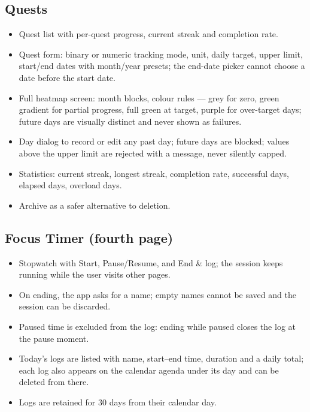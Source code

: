 \documentclass[12pt,a4paper]{article}
\begin{document}
\subsection{Quests}
\begin{itemize}
  \item Quest list with per-quest progress, current streak and completion rate.
  \item Quest form: binary or numeric tracking mode, unit, daily target,
        upper limit, start/end dates with month/year presets; the end-date
        picker cannot choose a date before the start date.
  \item Full heatmap screen: month blocks, colour rules --- grey for zero,
        green gradient for partial progress, full green at target, purple
        for over-target days; future days are visually distinct and never
        shown as failures.
  \item Day dialog to record or edit any past day; future days are blocked;
        values above the upper limit are rejected with a message, never
        silently capped.
  \item Statistics: current streak, longest streak, completion rate,
        successful days, elapsed days, overload days.
  \item Archive as a safer alternative to deletion.
\end{itemize}

\subsection{Focus Timer (fourth page)}
\begin{itemize}
  \item Stopwatch with Start, Pause/Resume, and End \& log; the session
        keeps running while the user visits other pages.
  \item On ending, the app asks for a name; empty names cannot be saved and
        the session can be discarded.
  \item Paused time is excluded from the log: ending while paused closes
        the log at the pause moment.
  \item Today's logs are listed with name, start--end time, duration and a
        daily total; each log also appears on the calendar agenda under its
        day and can be deleted from there.
  \item Logs are retained for 30 days from their calendar day.
\end{itemize}
\end{document}
